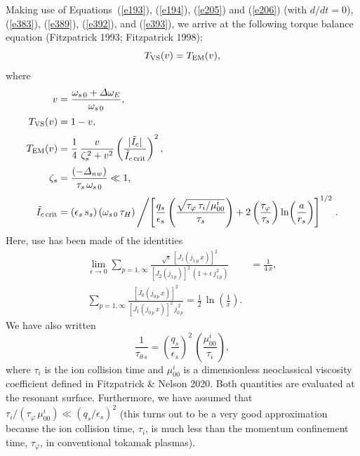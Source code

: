 \documentclass[notitlepage,12pt]{article}
\begin{document}
Making use of Equations~(\ref{e193}), (\ref{e194}), (\ref{e205}) and (\ref{e206}) (with $d/dt=0$), (\ref{e383}), (\ref{e389}), (\ref{e392}),
and (\ref{e393}), we arrive at the following torque balance equation (Fitzpatrick 1993; Fitzpatrick 1998):
\begin{equation}\label{e394}
T_{\rm VS}(v)= T_{\rm EM}(v),
\end{equation}
where 
\begin{align}
v&=\frac{\omega_{s\,0}+{\mit\Delta}\omega_E}{\omega_{s\,0}},\\[0.5ex]
T_{\rm VS}(v) &= 1- v,\\[0.5ex]
T_{\rm EM}(v) &= \frac{1}{4}\,\frac{v}{\zeta_s^{\,2}+v^2}
\left(\frac{|\tilde{I}_c|}{\tilde{I}_{c\,{\rm crit}}}\right)^2,\\[0.5ex]
\zeta_s &= \frac{(-{\mit\Delta}_{nw})}{\tau_s\,\omega_{s\,0}}\ll 1,\\[0.5ex]
\tilde{I}_{c\,{\rm crit}}&= (\epsilon_s\,s_s)\,(\omega_{s\,0}\,\tau_H)\left/
\left[\frac{q_s}{\epsilon_s}\left(\frac{\sqrt{\tau_\varphi\,\tau_i/\mu_{00}^i}}{\tau_s}\right)+2\left(\frac{\tau_\varphi}{\tau_s}\right) \ln\!\left(\frac{a}{r_s}\right)\right]^{1/2}\right..\label{e420}
\end{align}
Here, use has been made of the identities
\begin{align}
\lim_{\epsilon\rightarrow 0}\sum_{p=1,\infty} \frac{\sqrt{\epsilon}\,[J_1(j_{1\,p}\,x)]^{2}}{[J_2(j_{1\,p})]^2\,(1+\epsilon\,j_{1\,p}^2)}
&=\frac{1}{4\,x},\\[0.5ex]
\sum_{p=1,\infty} \frac{[J_0(j_{0\,p}\,x)]^2}{[J_1(j_{0\,p}\,x)]^2\,j_{0\,p}^{\,2}} =\frac{1}{2}\,\ln\!\left(\frac{1}{x}\right).
\end{align}
We have also written 
\begin{equation}
\frac{1}{\tau_{\theta\,s}} = \left(\frac{q_s}{\epsilon_s}\right)^2\,\left(\frac{\mu_{00}^i}{\tau_{i}}\right),
\end{equation}
 where
$\tau_i$ is the ion collision time and $\mu_{00}^i$ is a dimensionless neoclassical viscosity coefficient defined in Fitzpatrick \& Nelson 2020. Both quantities are evaluated at the resonant surface. Furthermore,
 we have assumed that $\tau_i/(\tau_\varphi\,\mu_{00}^i)\ll (q_s/\epsilon_s)^2$ (this
turns out to be  
a very good approximation because the ion collision time, $\tau_i$, is much less than the momentum confinement
time, $\tau_\varphi$, in conventional tokamak plasmas).  
\end{document}
